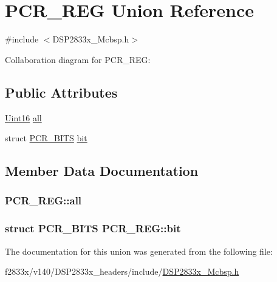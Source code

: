\hypertarget{union_p_c_r___r_e_g}{}\section{P\+C\+R\+\_\+\+R\+E\+G Union Reference}
\label{union_p_c_r___r_e_g}


{\ttfamily \#include $<$D\+S\+P2833x\+\_\+\+Mcbsp.\+h$>$}



Collaboration diagram for P\+C\+R\+\_\+\+R\+E\+G\+:
\subsection*{Public Attributes}
\begin{DoxyCompactItemize}
\item 
\hyperlink{_d_s_p2833x___device_8h_a59a9f6be4562c327cbfb4f7e8e18f08b}{Uint16} \hyperlink{union_p_c_r___r_e_g_a98bf8dfc2915261a7150e035d3c183b9}{all}
\item 
struct \hyperlink{struct_p_c_r___b_i_t_s}{P\+C\+R\+\_\+\+B\+I\+T\+S} \hyperlink{union_p_c_r___r_e_g_a657a62b0bdcc8ac8d7b80b4b7240f569}{bit}
\end{DoxyCompactItemize}


\subsection{Member Data Documentation}
\hypertarget{union_p_c_r___r_e_g_a98bf8dfc2915261a7150e035d3c183b9}{}
\subsubsection[{all}]{ P\+C\+R\+\_\+\+R\+E\+G\+::all}\label{union_p_c_r___r_e_g_a98bf8dfc2915261a7150e035d3c183b9}
\hypertarget{union_p_c_r___r_e_g_a657a62b0bdcc8ac8d7b80b4b7240f569}{}
\subsubsection[{bit}]{\setlength{\rightskip}{0pt plus 5cm}struct {\bf P\+C\+R\+\_\+\+B\+I\+T\+S} P\+C\+R\+\_\+\+R\+E\+G\+::bit}\label{union_p_c_r___r_e_g_a657a62b0bdcc8ac8d7b80b4b7240f569}


The documentation for this union was generated from the following file\+:\begin{DoxyCompactItemize}
\item 
f2833x/v140/\+D\+S\+P2833x\+\_\+headers/include/\hyperlink{_d_s_p2833x___mcbsp_8h}{D\+S\+P2833x\+\_\+\+Mcbsp.\+h}\end{DoxyCompactItemize}
